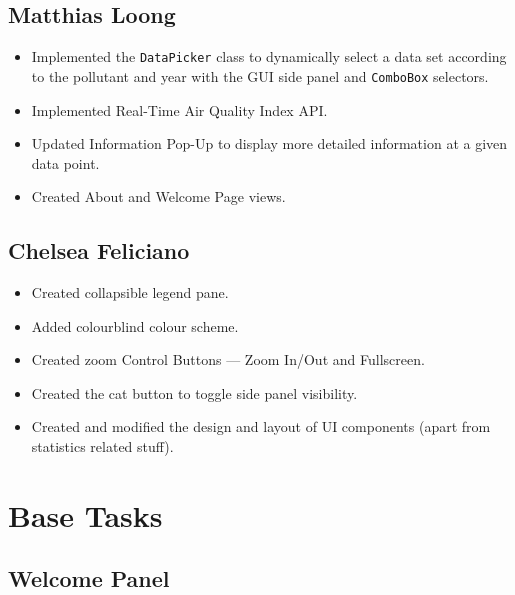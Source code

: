 \documentclass[10pt, a4paper]{scrartcl}
\begin{document}
\begin{multicols}{2}
\vspace{-0.2em}

\subsection{Matthias Loong}

\vspace{-0.2em}

\begin{itemize}
    \itemsep-0.3em 
    \item Implemented the \verb|DataPicker| class to dynamically select a data set according to the pollutant and year with the
    GUI side panel and \verb|ComboBox| selectors.
    \item Implemented Real-Time Air Quality Index API.
    \item Updated Information Pop-Up to display more detailed information at a given data point.
    \item Created About and Welcome Page views.
\end{itemize}

\vspace{-0.2em}

\subsection{Chelsea Feliciano}

\vspace{-0.2em}

\begin{itemize}
    \itemsep-0.3em 
    \item Created collapsible legend pane.
    \item Added colourblind colour scheme.
    \item Created zoom Control Buttons — Zoom In/Out and Fullscreen.
    \item Created the cat button to toggle side panel visibility.
    \item Created and modified the design and layout of UI components (apart from statistics related stuff).
\end{itemize}

\vspace{-0.2em}

\section{Base Tasks}

\subsection{Welcome Panel}


\end{multicols}
\end{document}
